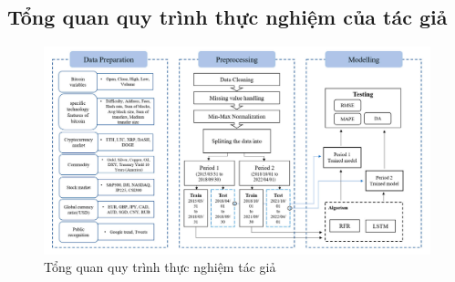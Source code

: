 \subsection{Tổng quan quy trình thực nghiệm của tác giả}

\begin{figure}[h!]
    \centering
    \includegraphics[width=\textwidth, keepaspectratio]{images/Chapter4/process.png}
    \caption{Tổng quan quy trình thực nghiệm tác giả}
    \label{fig:ori_process}
\end{figure}

